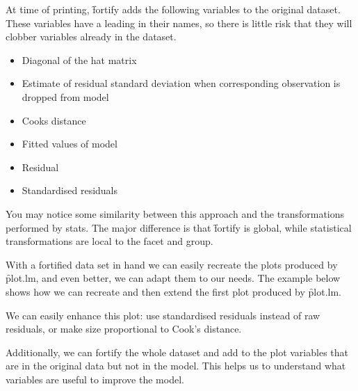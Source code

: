 At time of printing, \f{fortify} adds the following variables to the original dataset.  These variables have a leading  in their names, so there is little risk that they will clobber variables already in the dataset.  

\begin{itemize}
  \item {} Diagonal of the hat matrix
  \item {} Estimate of residual standard deviation when corresponding observation is dropped from model
  \item {} Cooks distance
  \item {} Fitted values of model
  \item {} Residual
  \item {} Standardised residuals
\end{itemize}

You may notice some similarity between this approach and the transformations performed by stats.  The major difference is that \f{fortify} is global, while statistical transformations are local to the facet and group.

With a fortified data set in hand we can easily recreate the plots produced by \f{plot.lm}, and even better, we can adapt them to our needs.  The example below shows how we can recreate and then extend the first plot produced by \f{plot.lm}.

% 
% 


We can easily enhance this plot: use standardised residuals instead of raw residuals, or make size proportional to Cook's distance.  

% 


Additionally, we can fortify the whole dataset and add to the plot variables that are in the original data but not in the model.  This helps us to understand what variables are useful to improve the model. 

% 



